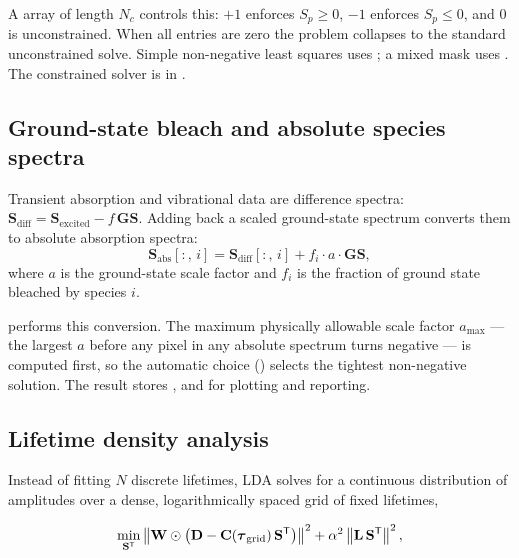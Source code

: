 A  array of length $N_c$ controls this: $+1$ enforces
$S_p \ge 0$, $-1$ enforces $S_p \le 0$, and $0$ is unconstrained. When all
entries are zero the problem collapses to the standard unconstrained solve.
Simple non-negative least squares uses ; a mixed
mask uses . The constrained solver is in
.

\subsection{Ground-state bleach and absolute species spectra}\label{sec:groundstate-overview}

Transient absorption and vibrational data are difference spectra:
$\mathbf{S}_\text{diff} = \mathbf{S}_\text{excited} - f\,\mathbf{GS}$.
Adding back a scaled ground-state spectrum converts them to absolute absorption
spectra:
\begin{equation}
  \mathbf{S}_\text{abs}[:,\,i]
    = \mathbf{S}_\text{diff}[:,\,i] + f_i\cdot a\cdot \mathbf{GS},
\end{equation}
where $a$ is the ground-state scale factor and $f_i$ is the fraction of
ground state bleached by species $i$.

 performs this
conversion. The maximum physically allowable scale factor $a_\text{max}$ ---
the largest $a$ before any pixel in any absolute spectrum turns negative --- is
computed first, so the automatic choice () selects the
tightest non-negative solution. The result stores ,
 and  for plotting and reporting.

\subsection{Lifetime density analysis}\label{sec:lda}

Instead of fitting $N$ discrete lifetimes, LDA solves for a continuous
distribution of amplitudes over a dense, logarithmically spaced grid of fixed
lifetimes,

\begin{equation}
  \min_{\mathbf{S}^{\mathsf{T}}}
  \left\lVert \mathbf{W} \odot \left(\mathbf{D} - \mathbf{C}(\boldsymbol{\tau}_\text{grid})\,
  \mathbf{S}^{\mathsf{T}}\right)\right\rVert^2
  + \alpha^2 \left\lVert \mathbf{L}\,\mathbf{S}^{\mathsf{T}}\right\rVert^2,
  \label{eq:lda}
\end{equation}

